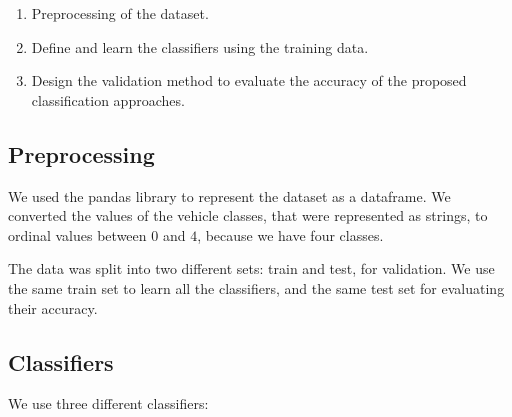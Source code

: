 \documentclass{article} %
\begin{document}
\begin{enumerate} 

 \item Preprocessing of the dataset.

 \item Define and learn the classifiers using the training data.

 \item  Design the validation method to evaluate the accuracy of the proposed classification approaches.  
\end{enumerate} 


\subsection{Preprocessing}

  We used the pandas library to represent the dataset as a dataframe. We converted the values of the vehicle classes, that were represented as strings, to ordinal values between $0$ and $4$, because we have four classes.

  The data was split into two different sets: train and test, for validation. We use the same train set to learn all the classifiers, and the same test set for evaluating their accuracy.


\subsection{Classifiers}

 We use three different classifiers:
\end{document}
